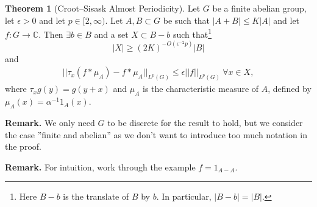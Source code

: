 \documentclass{article}
\theoremstyle{definition}
\newtheorem{theorem}{Theorem}[section]
\begin{document}
\begin{theorem}[Croot--Sisask Almost Periodicity]\label{Theorem3.8}
    Let $G$ be a finite abelian group, let $\epsilon>0$ and let $p \in [2,\infty)$. Let $A,B \subset G$ be such that $\left|A+B\right|\le K\left|A\right|$ and let $f: G \to \mathbb{C}$. Then $\exists b \in B$ and a set $X \subset B-b$ such that\footnote{Here $B-b$ is the translate of $B$ by $b$. In particular, $\left|B-b\right|=\left|B\right|$.} $$\left|X\right|\ge (2K)^{-O(\epsilon^{-2}p)} \left|B\right|$$ and 
    \begin{align*}
        ||\tau_x (f * \mu_A) - f * \mu_A||_{L^p(G)} \le \epsilon ||f||_{L^p(G)} ~\forall x \in X,
    \end{align*}
    where $\tau_x g(y) = g(y+x)$ and $\mu_A$ is the characteristic measure of $A$, defined by $\mu_A(x) = \alpha^{-1} 1_A(x)$.
\end{theorem}
\textbf{Remark.} We only need $G$ to be discrete for the result to hold, but we consider the case ''finite and abelian'' as we don't want to introduce too much notation in the proof.
\vspace{1mm}
 
\textbf{Remark.} For intuition, work through the example $f = 1_{A-A}$.
\end{document}
